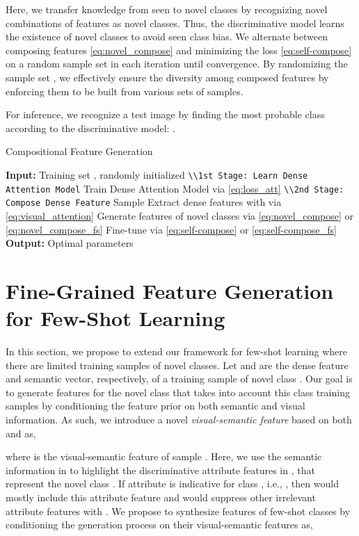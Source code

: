 \documentclass[10pt,journal,compsoc]{IEEEtran}
\newcommand{\1}{\boldsymbol{1}}
\newcommand{\0}{\boldsymbol{0}}
\newcommand{\<}{\langle}
\renewcommand{\>}{\rangle}
\begin{document}
Here, we transfer knowledge from seen to novel classes by recognizing novel combinations of features as novel classes.
Thus, the discriminative model learns the existence of novel classes to avoid seen class bias.
We alternate between composing features \eqref{eq:novel_compose} and minimizing the loss \eqref{eq:self-compose} on a random sample set  in each iteration until convergence.
By randomizing the sample set , we effectively ensure the diversity among composed features by enforcing them to be built from various sets of samples.

For inference, we recognize a test image by finding the most probable class according to the discriminative model: .

\begin{algorithm}[H]
\small
\caption{Compositional Feature Generation}
\label{alg:overall_pipeline}
\begin{algorithmic}
\State \textbf{Input:} Training set , randomly initialized 
\State \texttt{\textbackslash\textbackslash 1st Stage: Learn Dense Attention Model}
\For{}
\State Train Dense Attention Model  via \eqref{eq:loss_att} 
\EndFor
\State \texttt{\textbackslash\textbackslash 2nd Stage: Compose Dense Feature}
\For{}
\State Sample 
\State Extract dense features  with  via \eqref{eq:visual_attention}
\State Generate features of novel classes via \eqref{eq:novel_compose} or \eqref{eq:novel_compose_fs}
\State Fine-tune  via \eqref{eq:self-compose} or \eqref{eq:self-compose_fs}
\EndFor
\State \textbf{Output:} Optimal parameters
\end{algorithmic}
\end{algorithm}

\section{Fine-Grained Feature Generation for Few-Shot Learning}
\label{sec:visual_semantic_information}
In this section, we propose to extend our framework for few-shot learning where there are limited training samples of novel classes.
Let  and  are the dense feature and semantic vector, respectively, of a training sample of novel class .
Our goal is to generate features for the novel class  that takes into account this class training samples by conditioning the feature prior on both semantic and visual information.
As such, we introduce a novel \textit{visual-semantic feature} based on both  and  as,

where  is the visual-semantic feature of sample .
Here, we use the semantic information in  to highlight the discriminative attribute features in , that represent the novel class .
If attribute  is indicative for class  , i.e., , then  would mostly include this attribute feature  and would suppress other irrelevant attribute features with .
We propose to synthesize features of few-shot classes by conditioning the generation process on their visual-semantic features as,
\end{document}
